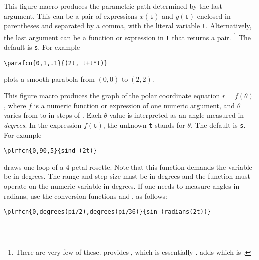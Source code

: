 \documentclass[letterpaper]{article}
\begin{document}
This figure macro produces the parametric path determined by the last
argument. This can be a pair of expressions $x(\mathtt{t})$ and
$y(\mathtt{t})$ enclosed in parentheses and separated by a comma, with
the literal variable \texttt{t}. Alternatively, the last argument can be
a \MF{} function or expression in \texttt{t} that returns a pair.%
    \footnote{There are very few of these. \CMF{} provides ,
    which is essentially . \Mfp{} adds 
    which is .}
The default  is \texttt{s}. For example
\begin{verbatim}
\parafcn{0,1,.1}{(2t, t+t*t)}
\end{verbatim}
plots a smooth parabola from $(0,0)$ to $(2,2)$.

\begin{cd}
%
\end{cd}

This figure macro produces the graph of the polar coordinate equation
$r=f(\theta)$, where $f$ is a \MF{} numeric function or expression of
one numeric argument, and $\theta$ varies from
 to  in
steps of \meta{$\Delta\theta$}. Each $\theta$ value is interpreted as an
angle measured in \emph{degrees}. In the expression $f(\mathtt{t})$, the
unknown \texttt{t} stands for $\theta$. The default  is
\texttt{s}. For example
\begin{verbatim}
\plrfcn{0,90,5}{sind (2t)}
\end{verbatim}
draws one loop of a 4-petal rosette. Note that this function demands the
variable  be in degrees. The range and step size must be in
degrees and the function must operate on the numeric variable  in
degrees. If one needs to measure angles in radians, use the conversion
functions  and , as follows:
\begin{verbatim}
\plrfcn{0,degrees(pi/2),degrees(pi/36)}{sin (radians(2t))}
\end{verbatim}


\begin{cd}
%
    \\
%
%
\end{cd}
\end{document}
